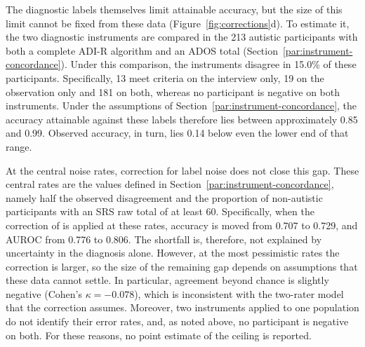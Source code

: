 The diagnostic labels themselves limit attainable accuracy, but the size of this limit
cannot be fixed from these data (Figure~\ref{fig:corrections}d). To estimate it, the two
diagnostic instruments are compared in the 213 autistic participants with both a complete
ADI-R algorithm and an ADOS total (Section~\ref{par:instrument-concordance}). Under this comparison, the
instruments disagree in 15.0\% of these participants. Specifically, 13 meet criteria on the
interview only, 19 on the observation only and 181 on both, whereas no participant is
negative on both instruments. Under the
assumptions of Section~\ref{par:instrument-concordance}, the accuracy attainable against these labels
therefore lies between approximately 0.85 and 0.99. Observed accuracy, in turn, lies 0.14
below even the lower end of that range.

At the central noise rates, correction for label noise does not close this gap. These
central rates are the values defined in Section~\ref{par:instrument-concordance}, namely half the observed
disagreement and the proportion of non-autistic participants with an SRS raw total of at
least 60. Specifically, when the correction of \citet{Menonetal2015} is applied at these
rates, accuracy is moved from 0.707 to 0.729, and AUROC from 0.776 to 0.806. The shortfall
is, therefore, not explained by uncertainty in the diagnosis alone. However, at the most pessimistic rates the correction is larger, so the size of the
remaining gap depends on assumptions that these data cannot settle. In particular,
agreement beyond chance is slightly negative (Cohen's $\kappa=-0.078$), which is
inconsistent with the two-rater model that the correction assumes. Moreover, two
instruments applied to one population do not identify their error rates, and, as noted above, no participant is negative on both. For these
reasons, no point
estimate of the ceiling is reported.
